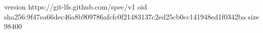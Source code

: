 version https://git-lfs.github.com/spec/v1
oid sha256:9f47ea66dec46a8b909786afcfc0f21483137c2ed25cb0cc141948ed1f0342ba
size 98400
